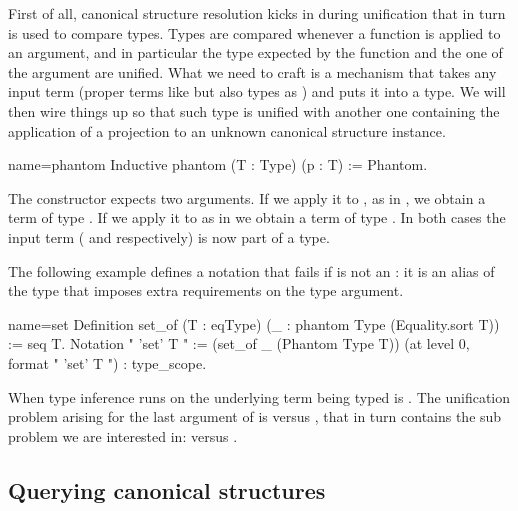 First of all, canonical structure resolution kicks in during
unification that in turn is used to compare types.  Types are
compared whenever a function is applied to an argument, and in
particular the type expected by the function and the one of the
argument are unified.  What we need to craft is a mechanism that
takes any input term (proper terms like  but also types as )
and puts it into a type.  We will then wire things up so that such
type is unified with another one containing the application of
a projection to an unknown canonical structure instance.

\begin{coq}{name=phantom}{}
Inductive phantom (T : Type) (p : T) := Phantom.
\end{coq}

The  constructor expects two arguments.  If we apply
it to , as in , we obtain a term
of type .  If we apply it to  as
in  we obtain a term
of type .  In both cases the
input term ( and  respectively) is now part of a type.

The following example defines a notation  that
fails if  is not an : it is an alias of the type
 that imposes extra requirements on the type argument.

\begin{coq}{name=set}{}
Definition set_of (T : eqType) (_ : phantom Type (Equality.sort T)) := seq T.
Notation "{ 'set' T }" := (set_of _ (Phantom Type T))
  (at level 0, format "{ 'set'  T }") : type_scope.
\end{coq}

When type inference runs on  the underlying term being
typed is .
The unification problem arising for the last argument of 
is  versus
, that in turn contains the sub problem
we are interested in:  versus .

\subsection{Querying canonical structures}\label{sec:phantom}


